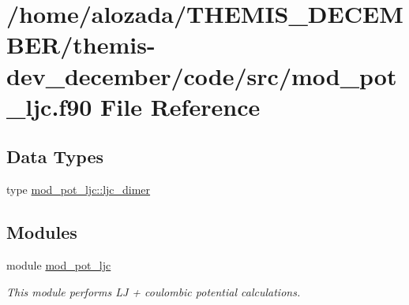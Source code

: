 \hypertarget{mod__pot__ljc_8f90}{}\section{/home/alozada/\+T\+H\+E\+M\+I\+S\+\_\+\+D\+E\+C\+E\+M\+B\+E\+R/themis-\/dev\+\_\+december/code/src/mod\+\_\+pot\+\_\+ljc.f90 File Reference}
\label{mod__pot__ljc_8f90}
\subsection*{Data Types}
\begin{DoxyCompactItemize}
\item 
type \hyperlink{structmod__pot__ljc_1_1ljc__dimer}{mod\+\_\+pot\+\_\+ljc\+::ljc\+\_\+dimer}
\end{DoxyCompactItemize}
\subsection*{Modules}
\begin{DoxyCompactItemize}
\item 
module \hyperlink{namespacemod__pot__ljc}{mod\+\_\+pot\+\_\+ljc}
\begin{DoxyCompactList}\small\item\em This module performs LJ + coulombic potential calculations. \end{DoxyCompactList}\end{DoxyCompactItemize}
